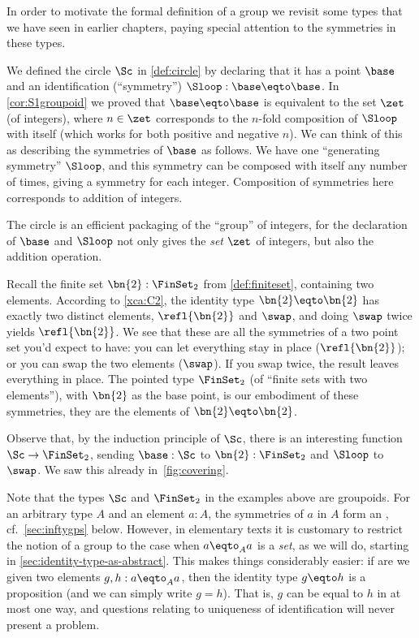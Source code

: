 In order to motivate the formal definition of a group we
revisit some types that we have seen in earlier chapters,
paying special attention to the symmetries in these types.
\begin{example}\label{ex:base=base}
  We defined the circle $\Sc$ in \cref{def:circle} by declaring
  that it has a point $\base$ and an identification (``symmetry'')
  $\Sloop:\base\eqto\base$.
  In \cref{cor:S1groupoid} we proved that $\base\eqto\base$ is equivalent
  to the set $\zet$ (of integers),
  where $n\in\zet$ corresponds to the $n$-fold composition of $\Sloop$ with itself
  (which works for both positive and negative $n$).
  We can think of this as describing the symmetries of $\base$ as follows.
  We have one ``generating symmetry'' $\Sloop$,
  and this symmetry can be composed with itself any number of times,
  giving a symmetry for each integer.
  Composition of symmetries here corresponds to addition of integers.

  The circle is an efficient packaging of the ``{group}'' of integers, 
  for the declaration of $\base$ and $\Sloop$ not only gives the \emph{set}
  $\zet$ of integers, but also the addition operation.
\end{example}
\begin{example}
  Recall the finite set $\bn{2}:\FinSet_2$ from \cref{def:finiteset},
  containing two elements.
  According to \cref{xca:C2}, the identity type $\bn{2} \eqto \bn{2}$ 
  has exactly two distinct elements, $\refl{\bn{2}}$ and $\swap$,
  and doing $\swap$ twice yields $\refl{\bn{2}}$.
  We see that these are all the symmetries
  of a two point set you'd expect to have:
  you can let everything stay in place ($\refl{\bn{2}}$);
  or you can swap the two elements ($\swap$).
  If you swap twice, the result leaves everything in place.
  The pointed type $\FinSet_2$ (of ``finite sets with two elements''),
  with $\bn{2}$ as the base point, is our embodiment of these symmetries, 
  \ie they are the elements of $\bn{2} \eqto \bn{2}$.

  Observe that, by the induction principle of $\Sc$,
  there is an interesting function $\Sc\to\FinSet_2$,
  sending $\base:\Sc$ to $\bn{2} :\FinSet_2$ and $\Sloop$ to $\swap$.
  We saw this already in~\cref{fig:covering}.
\end{example}

Note that the types $\Sc$ and $\FinSet_2$ in the examples above are groupoids.
For an arbitrary type $A$ and an element $a:A$,
the symmetries of $a$ in $A$ form an \inftygp, cf.~\cref{sec:inftygps} below.
However, in elementary texts it is customary to restrict the notion 
of a group to the case when $a\eqto_A a$ is a \emph{set}, 
as we will do, starting in \cref{sec:identity-type-as-abstract}.
This makes things considerably easier: if are we given two elements 
$g,h:a\eqto_A a$, then the identity type $g\eqto h$ is a proposition
(and we can simply write $g = h$). That is, $g$ can be equal to $h$ in 
at most one way, and questions relating to uniqueness of
identification will never present a problem.

